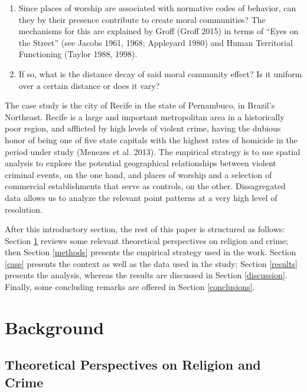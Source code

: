 \documentclass[smallextended]{svjour3}       %
\begin{document}
\begin{enumerate}
\def\labelenumi{\arabic{enumi}.}
\item
  Since places of worship are associated with normative codes of
  behavior, can they by their presence contribute to create moral
  communities? The mechanisms for this are explained by Groff (Groff
  2015) in terms of ``Eyes on the Street'' (see Jacobs 1961, 1968;
  Appleyard 1980) and Human Territorial Functioning (Taylor 1988, 1998).
\item
  If so, what is the distance decay of said moral community effect? Is
  it uniform over a certain distance or does it vary?
\end{enumerate}

The case study is the city of Recife in the state of Pernambuco, in
Brazil's Northeast. Recife is a large and important metropolitan area in
a historically poor region, and afflicted by high levels of violent
crime, having the dubious honor of being one of five state capitals with
the highest rates of homicide in the period under study (Menezes et al.
2013). The empirical strategy is to use spatial analysis to explore the
potential geographical relationships between violent criminal events, on
the one hand, and places of worship and a selection of commercial
establishments that serve as controls, on the other. Dissagregated data
allows us to analyze the relevant point patterns at a very high level of
resolution.

After this introductory section, the rest of this paper is structured as
follows: Section \ref{background} reviews some relevant theoretical
perspectives on religion and crime; then Section \ref{methods} presents
the empirical strategy used in the work. Section \ref{case} presents the
context as well as the data used in the study; Section \ref{results}
presents the analysis, whereas the results are discussed in Section
\ref{discussion}. Finally, some concluding remarks are offered in
Section \ref{conclusions}.

\hypertarget{background}{%
\section{Background}\label{background}}

\hypertarget{theoretical-perspectives-on-religion-and-crime}{%
\subsection{Theoretical Perspectives on Religion and
Crime}\label{theoretical-perspectives-on-religion-and-crime}}
\end{document}
